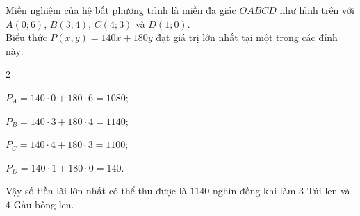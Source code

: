 \begin{ex}
{\begin{center}
		\end{center}
		Miền nghiệm của hệ bất phương trình là miền đa giác $OABCD$ như hình trên với $A\left({0; 6}\right)$, $B\left({3; 4}\right)$, $C\left({4; 3}\right)$ và $D\left({1; 0}\right)$. \\
		Biểu thức $P\left({x, y}\right) = 140x + 180y$ đạt giá trị lớn nhất tại một trong các đỉnh này:
		\begin{enumEX}[\small $\bullet$]{2}
			\item ${P_A} = 140 \cdot 0 + 180 \cdot 6 = 1080$;
			\item ${P_B} = 140 \cdot 3 + 180 \cdot 4 = 1140$;
			\item ${P_C} = 140 \cdot 4 + 180 \cdot 3 = 1100$;
			\item ${P_D} = 140 \cdot 1 + 180 \cdot 0 = 140$.
		\end{enumEX}
		Vậy số tiền lãi lớn nhất có thể thu được là $1140$ nghìn đồng khi làm $3$ Túi len và $4$ Gấu bông len.
	}
\end{ex}

